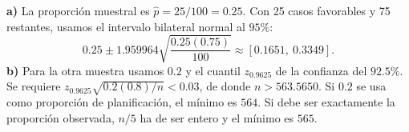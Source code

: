\textbf{a)} La proporción muestral es $\hat p=25/100=0.25$.
Con 25 casos favorables y 75 restantes, usamos el intervalo
bilateral normal al $95\%$:
\[
0.25\pm1.959964\sqrt{\frac{0.25(0.75)}{100}}
\approx\boxed{[0.1651,\ 0.3349]}.
\]
\textbf{b)} Para la otra muestra usamos $0.2$ y el cuantil
$z_{0.9625}$ de la confianza del $92.5\%$. Se requiere
$z_{0.9625}\sqrt{0.2(0.8)/n}<0.03$, de donde $n>563.5650$.
Si $0.2$ se usa como proporción de planificación, el mínimo
es $\boxed{564}$. Si debe ser exactamente la proporción
observada, $n/5$ ha de ser entero y el mínimo es $\boxed{565}$.
